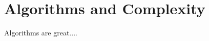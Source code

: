 \documentclass[../main/main.tex]{subfiles}
\begin{document}
\chapter{Algorithms and Complexity}
\label{sec:complexity}


Algorithms are great....
\end{document}
